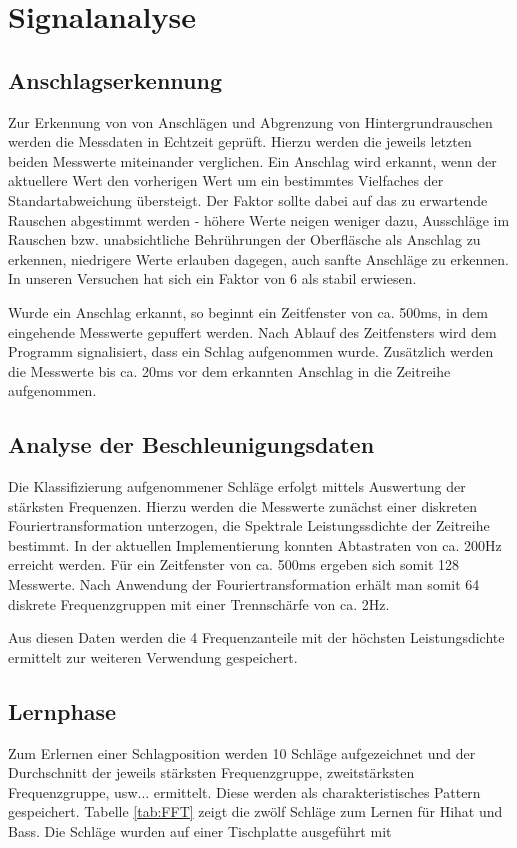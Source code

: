 \section*{Signalanalyse}
\label{sec:Signalanalyse}
\subsection*{Anschlagserkennung}
Zur Erkennung von von Anschlägen und Abgrenzung von Hintergrundrauschen werden die Messdaten in Echtzeit geprüft. Hierzu werden die jeweils letzten beiden Messwerte miteinander verglichen. Ein Anschlag wird erkannt, wenn der aktuellere Wert den vorherigen Wert um ein bestimmtes Vielfaches der Standartabweichung übersteigt. Der Faktor sollte dabei auf das zu erwartende Rauschen abgestimmt werden - höhere Werte neigen weniger dazu, Ausschläge im Rauschen bzw. unabsichtliche Behrührungen der Oberfläsche als Anschlag zu erkennen, niedrigere Werte erlauben dagegen, auch sanfte Anschläge zu erkennen. In unseren Versuchen hat sich ein Faktor von 6 als stabil erwiesen.

Wurde ein Anschlag erkannt, so beginnt ein Zeitfenster von ca. 500ms, in dem eingehende Messwerte gepuffert werden. Nach Ablauf des Zeitfensters wird dem Programm signalisiert, dass ein Schlag aufgenommen wurde. Zusätzlich werden die Messwerte bis ca. 20ms vor dem erkannten Anschlag in die Zeitreihe aufgenommen.

\subsection*{Analyse der Beschleunigungsdaten}
Die Klassifizierung aufgenommener Schläge erfolgt mittels Auswertung der stärksten Frequenzen. Hierzu werden die Messwerte zunächst einer diskreten Fouriertransformation unterzogen, die Spektrale Leistungssdichte der Zeitreihe bestimmt.
In der aktuellen Implementierung konnten Abtastraten von ca. 200Hz erreicht werden. 
Für ein Zeitfenster von ca. 500ms ergeben sich somit 128 Messwerte. 
Nach Anwendung der Fouriertransformation erhält man somit 64 diskrete Frequenzgruppen mit einer Trennschärfe von ca. 2Hz.

Aus diesen Daten werden die 4 Frequenzanteile mit der höchsten Leistungsdichte ermittelt zur weiteren Verwendung gespeichert.

\subsection*{Lernphase}
Zum Erlernen einer Schlagposition werden 10 Schläge aufgezeichnet und der Durchschnitt der jeweils stärksten Frequenzgruppe, zweitstärksten Frequenzgruppe, usw... ermittelt. Diese werden als charakteristisches Pattern gespeichert.
Tabelle \ref{tab:FFT} zeigt die zwölf Schläge zum Lernen für Hihat und Bass.
Die Schläge wurden auf einer Tischplatte ausgeführt mit 

